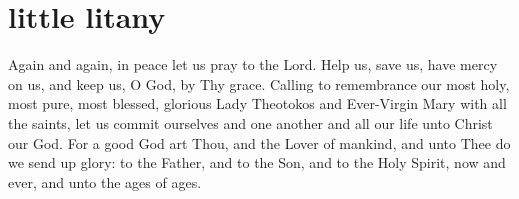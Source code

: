 \section{little litany}

\begin{liturgicaltext}
    \deacon Again and again, in peace let us pray to the Lord.
    \choir {}
    \deacon Help us, save us, have mercy on us, and keep us, O God, by Thy grace.
    \choir {}
    \deacon Calling to remembrance our most holy, most pure, most blessed, glorious Lady Theotokos and Ever-Virgin Mary with all the saints, let us commit ourselves and one another and all our life unto Christ our God.
    \choir {}
    \priest For a good God art Thou, and the Lover of mankind, and unto Thee do we send up glory: to the Father, and to the Son, and to the Holy Spirit, now and ever, and unto the ages of ages.
    \choir {}
\end{liturgicaltext}

